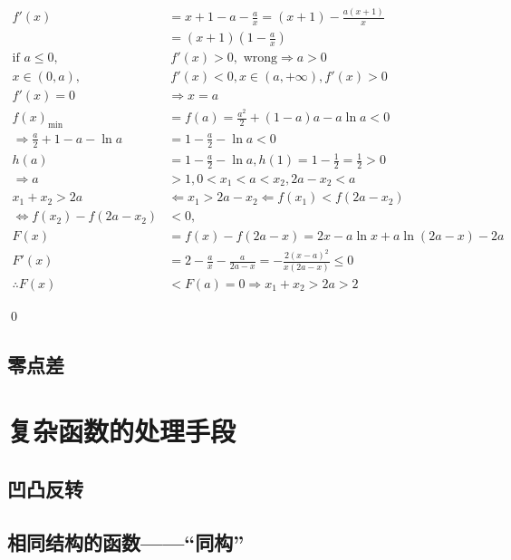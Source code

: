 \begin{jie}
            \begin{align*}
            f'(x) &= x + 1 - a - \frac{a}{x} = (x + 1) - \frac{a(x + 1)}{x} \\
            &= (x + 1)\left(1 - \frac{a}{x}\right) \\
            \text{if } a \leqslant 0, & \ f'(x) > 0, \text{ wrong} \Rightarrow a > 0 \\
            x \in (0, a), & \ f'(x) < 0, x \in (a, +\infty), f'(x) > 0 \\
            f'(x) = 0 & \Rightarrow x = a \\
            f(x)_{\min} &= f(a) = \frac{a^2}{2} + (1-a)a - a\ln a < 0 \\
            \Rightarrow \frac{a}{2} + 1 - a - \ln a &= 1 - \frac{a}{2} - \ln a < 0 \\
            h(a) &= 1 - \frac{a}{2} - \ln a, h(1) = 1 - \frac{1}{2} = \frac{1}{2} > 0 \\
            \Rightarrow a &> 1, 0 < x_1 < a < x_2, 2a - x_2 < a \\
            x_1 + x_2 > 2a &\Leftarrow x_1 > 2a - x_2 \Leftarrow f(x_1) < f(2a - x_2) \\
            \Leftrightarrow f(x_2) - f(2a - x_2) &< 0, \\
            F(x) &= f(x) - f(2a - x) = 2x - a\ln x + a\ln(2a - x) - 2a \\
            F'(x) &= 2 - \frac{a}{x} - \frac{a}{2a - x} = -\frac{2(x - a)^2}{x(2a - x)} \leqslant 0 \\
            \therefore F(x) &< F(a) = 0 \Rightarrow x_1 + x_2 > 2a > 2
            \end{align*}
            
            \qed
\end{jie}





\clearpage
\subsection{零点差}
\clearpage

\section{复杂函数的处理手段}
\subsection{凹凸反转}
\clearpage
\subsection{相同结构的函数——“同构”}

